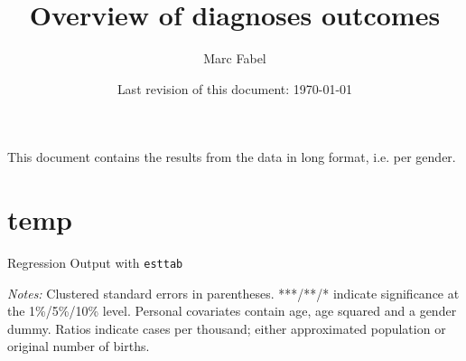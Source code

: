 \documentclass{scrartcl} %
\author{Marc Fabel}
\title{Overview of diagnoses outcomes}
\date{Last revision of this document: \today}
\begin{document}
\maketitle
This document contains the results from the data in long format, i.e. per gender.

\newpage


\section{temp}



%
%
%
%
\begin{table}[h] %
\begin{threeparttable}
\centering %
\caption{Regression Output with \texttt {esttab}} %
\label{table 1} %

\begin{tablenotes}
    \item \scriptsize 
\emph{Notes:} Clustered standard errors in parentheses. ***/**/* indicate significance at the 1\%/5\%/10\% level. Personal covariates contain age, age squared and a gender dummy. Ratios indicate cases per thousand; either approximated population or original number of births.
    \end{tablenotes}
  \end{threeparttable}
\end{table}
\end{document}
